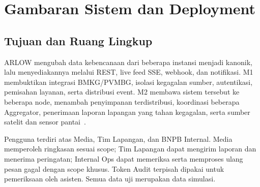 \chapter{Gambaran Sistem dan Deployment}
\section{Tujuan dan Ruang Lingkup}
ARLOW mengubah data kebencanaan dari beberapa instansi menjadi  kanonik, lalu menyediakannya melalui REST, live feed SSE, webhook, dan notifikasi. M1 membuktikan integrasi BMKG/PVMBG, isolasi kegagalan sumber, autentikasi, pemisahan layanan, serta distribusi event. M2 membawa sistem tersebut ke beberapa node, menambah penyimpanan terdistribusi, koordinasi beberapa Aggregator, penerimaan laporan lapangan yang tahan kegagalan, serta sumber satelit dan sensor pantai~\cite{spec,m1}.

Pengguna terdiri atas Media, Tim Lapangan, dan BNPB Internal. Media memperoleh ringkasan sesuai scope; Tim Lapangan dapat mengirim laporan dan menerima peringatan; Internal Ops dapat memeriksa serta memproses ulang pesan gagal dengan scope khusus. Token Audit terpisah dipakai untuk pemeriksaan oleh asisten. Semua data uji merupakan data simulasi.

